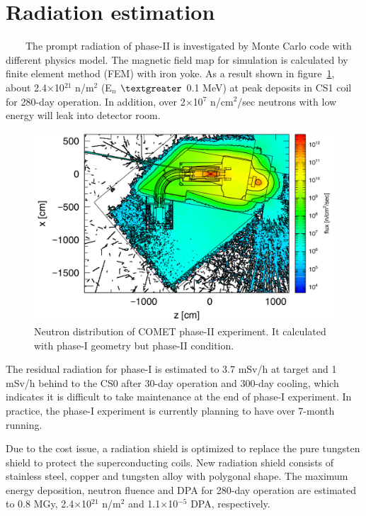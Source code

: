 \documentclass[a4paper, 10pt, twocolumn]{article}
\begin{document}
\section{Radiation estimation}
~~~~The prompt radiation of phase-II is investigated by Monte Carlo code with different physics model.
The magnetic field map for simulation is calculated by finite element method (FEM) with iron yoke.
As a result shown in figure~\ref{geo}, about 2.4$\times$10$^{21}$ n/m$^2$ (E$_n$ $\textgreater$ 0.1 MeV) at peak deposits in CS1 coil for 280-day operation.
In addition, over 2$\times$10$^7$ n/cm$^2$/sec neutrons with low energy will leak into detector room.
\begin{figure}[H]
 \centering
 \includegraphics[scale=0.3]{fig/neutron.pdf}
 \caption{Neutron distribution of COMET phase-II experiment. It calculated with phase-I geometry but phase-II condition.}
 \label{geo}
\end{figure}
The residual radiation for phase-I is estimated to 3.7 mSv/h at target and 1 mSv/h behind to the CS0 after 30-day operation and 300-day cooling, which indicates it is difficult to take maintenance at the end of phase-I experiment.
In practice, the phase-I experiment is currently planning to have over 7-month running.

Due to the cost issue, a radiation shield is optimized to replace the pure tungsten shield to protect the superconducting coils.
New radiation shield consists of stainless steel, copper and tungsten alloy with polygonal shape.
The maximum energy deposition, neutron fluence and DPA for 280-day operation are estimated to 0.8 MGy, 2.4$\times$10$^{21}$ n/m$^2$ and 1.1$\times$10$^{-5}$ DPA, respectively.
\end{document}
